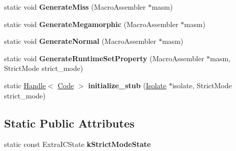 \begin{DoxyCompactItemize}
\item 
\hypertarget{classv8_1_1internal_1_1_store_i_c_a2279582bb891a58e88531edc83e610d2}{}static void {\bfseries Generate\+Miss} (Macro\+Assembler $\ast$masm)\label{classv8_1_1internal_1_1_store_i_c_a2279582bb891a58e88531edc83e610d2}

\item 
\hypertarget{classv8_1_1internal_1_1_store_i_c_a9c3bc2cdbaa4f91a75c4dd991ed801a8}{}static void {\bfseries Generate\+Megamorphic} (Macro\+Assembler $\ast$masm)\label{classv8_1_1internal_1_1_store_i_c_a9c3bc2cdbaa4f91a75c4dd991ed801a8}

\item 
\hypertarget{classv8_1_1internal_1_1_store_i_c_ae7a0b1a7c350508c34030dc3bcc24c8f}{}static void {\bfseries Generate\+Normal} (Macro\+Assembler $\ast$masm)\label{classv8_1_1internal_1_1_store_i_c_ae7a0b1a7c350508c34030dc3bcc24c8f}

\item 
\hypertarget{classv8_1_1internal_1_1_store_i_c_ad3dbf4d0865ab726989b96a08f2eb436}{}static void {\bfseries Generate\+Runtime\+Set\+Property} (Macro\+Assembler $\ast$masm, Strict\+Mode strict\+\_\+mode)\label{classv8_1_1internal_1_1_store_i_c_ad3dbf4d0865ab726989b96a08f2eb436}

\item 
\hypertarget{classv8_1_1internal_1_1_store_i_c_aa2e8314feb2f9a7326b7321214c6ad5f}{}static \hyperlink{classv8_1_1internal_1_1_handle}{Handle}$<$ \hyperlink{classv8_1_1internal_1_1_code}{Code} $>$ {\bfseries initialize\+\_\+stub} (\hyperlink{classv8_1_1internal_1_1_isolate}{Isolate} $\ast$isolate, Strict\+Mode strict\+\_\+mode)\label{classv8_1_1internal_1_1_store_i_c_aa2e8314feb2f9a7326b7321214c6ad5f}

\end{DoxyCompactItemize}
\subsection*{Static Public Attributes}
\begin{DoxyCompactItemize}
\item 
static const Extra\+I\+C\+State {\bfseries k\+Strict\+Mode\+State}
\end{DoxyCompactItemize}
